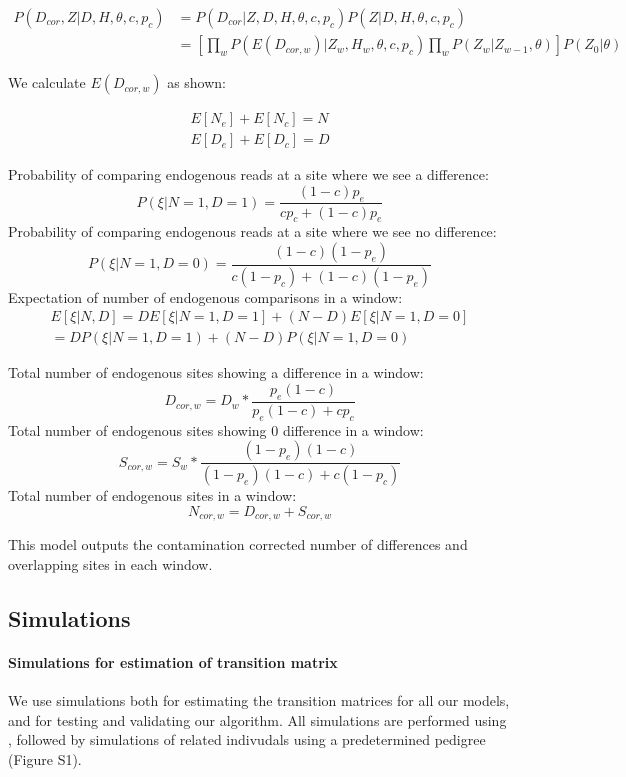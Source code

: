 \documentclass[12pt, letterpaper]{article}
\begin{document}
\begin{align}
    P(D_{cor},Z|D,H,\theta,c,p_c) &= P(D_{cor}|Z,D,H,\theta,c,p_c) P(Z|D,H,\theta,c,p_c)\nonumber\\
    &= [\prod_{w} P(E(D_{cor,w})|Z_w, H_w, \theta,c,p_c) \prod_{w} P(Z_w|Z_{w-1}, \theta)] P(Z_0| \theta)
\end{align}

We calculate $E(D_{cor,w})$ as shown:

\begin{align}
    E[N_e] + E[N_c] = N\\
    E[D_e] + E[D_c] = D
\end{align}

Probability of comparing endogenous reads at a site where we see a difference:
$$P(\xi | N = 1,D = 1)=\frac{(1-c) p_e}{c p_c + (1-c) p_e} $$
Probability of comparing endogenous reads at a site where we see no difference:
$$P(\xi | N = 1,D = 0)=\frac{(1-c)(1-p_e)}{c (1-p_c) + (1-c) (1-p_e)} $$
Expectation of number of endogenous comparisons in a window:
\begin{align}
    E[\xi | N, D] = D E[\xi | N=1, D=1] + (N-D) E[\xi | N=1, D=0]\\
    = D P(\xi | N=1, D=1) + (N-D) P(\xi | N=1, D=0)
\end{align}



Total number of endogenous sites showing a difference in a window: 
$$D_{cor,w} = D_w* \frac{p_e(1-c)}{p_e(1-c) + c p_c} $$
Total number of endogenous sites showing 0 difference in a window: 
$$S_{cor,w} = S_w* \frac{(1-p_e)(1-c)}{(1-p_e)(1-c) + c (1-p_c)} $$
Total number of endogenous sites in a window:
$$N_{cor,w} = D_{cor,w} + S_{cor,w}$$

This model outputs the contamination corrected number of differences and overlapping sites in each window.

\subsection{Simulations}

\paragraph{ Simulations for estimation of transition matrix}
We use simulations both for estimating the transition matrices for all our models, and for testing and validating our algorithm. All simulations are performed using  \cite{kelleher_efficient_2016}, followed by simulations of related indivudals using a predetermined pedigree (Figure S1).
\end{document}
